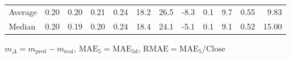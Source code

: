\begin{threeparttable}
{\begin{tabular}{lrrrrrrrrrrr}
Average &          0.20 &          0.20 &          0.21 &        0.24 &                18.2 &                26.5 &       -8.3 &                 0.1 &              9.7 &            0.55 &                   9.83 \\
 Median &          0.20 &          0.19 &          0.20 &        0.24 &                18.4 &                24.1 &       -5.1 &                 0.1 &              9.1 &            0.52 &                  15.00 \\
\bottomrule
\end{tabular}
}
\begin{tablenotes}\footnotesize
\item $m_\Delta=m_{\text{pred}}-m_{\text{real}}$,
$\mathrm{MAE}_5=\mathrm{MAE}_{5\text{d}}$,
$\mathrm{RMAE}=\mathrm{MAE}_5/\text{Close}$
\end{tablenotes}
\end{threeparttable}
\endgroup

